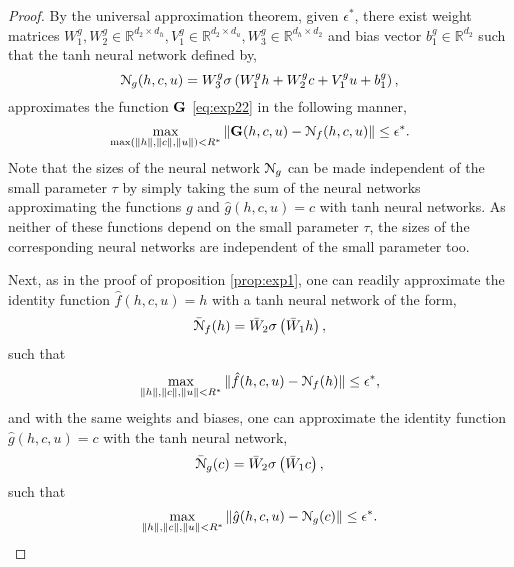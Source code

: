 \documentclass{article} \usepackage{iclr2022_conference,times}
\newcommand{\R}{{\mathbb R}}
\newcommand{\cN}{\EuScript{N}}
\newcommand{\bG}{{\bf G}}
\begin{document}
\begin{proof}
By the universal approximation theorem, given 
$\epsilon^{\ast}$, there exist weight matrices $W^g_1,W^g_2 \in \R^{d_2 \times d_h}, V^g_1 \in \R^{d_2\times d_u}, W^g_3 \in \R^{d_h \times d_2}$ and bias vector $b^g_1 \in \R^{d_2}$ such that the tanh neural network defined by,
\begin{equation}
\label{eq:ng}
\cN_g(h,c,u) = W^g_3\sigma\left(W^g_1 h + W^g_2c+ V^g_1 u + b^g_1 \right),
\end{equation}
approximates the function $\bG$ \eqref{eq:exp22} in the following manner, 
\begin{equation}
    \label{eq:exp23}
    \max\limits_{\max(\|h\|,\|c\|,\|u\|)< R^{\ast}} \|\bG(h,c,u) - \cN_f(h,c,u) \| \leq \epsilon^{\ast}.
\end{equation}
Note that the sizes of the neural network $\cN_g$ can be made independent of the small parameter $\tau$ by simply taking the sum of the neural networks approximating the functions $g$ and $\hat{g}(h,c,u) = c$ with tanh neural networks. As neither of these functions depend on the small parameter $\tau$, the sizes of the corresponding neural networks are independent of the small parameter too. 

Next, as in the proof of proposition \ref{prop:exp1}, one can readily approximate the identity function $\hat{f}(h,c,u) = h$ with a tanh neural network of the form,
\begin{equation}
\label{eq:nfh}
\bar{\cN}_f(h) = \bar{W}_2\sigma\left(\bar{W}_1 h \right),
\end{equation}
 such that
\begin{equation}
    \label{eq:exp24}
    \max\limits_{\|h\|,\|c\|,\|u\|< R^{\ast}} \|\hat{f}(h,c,u) - \cN_f(h) \| \leq \epsilon^{\ast},
\end{equation}
and with the same weights and biases, one can approximate the identity function $\hat{g}(h,c,u) = c$ with the tanh neural network,
\begin{equation}
\label{eq:ngh}
\bar{\cN}_g(c) = \bar{W}_2\sigma\left(\bar{W}_1 c \right),
\end{equation}
 such that
\begin{equation}
    \label{eq:exp26}
    \max\limits_{\|h\|,\|c\|,\|u\|< R^{\ast}} \|\hat{g}(h,c,u) - \cN_g(c) \| \leq \epsilon^{\ast}.
\end{equation}


\end{proof}
\end{document}
